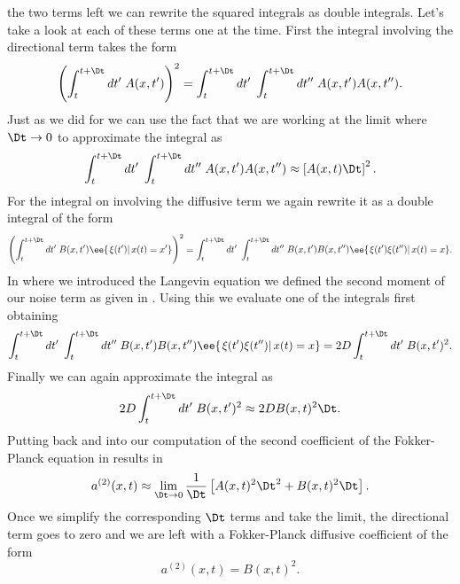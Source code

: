 the two terms left we can rewrite the squared integrals as double integrals.
Let's take a look at each of these terms one at the time. First the integral 
involving the directional term takes the form
\begin{equation}
    \left(  
        \int_t^{t + \Dt} dt'\; A(x, t')
    \right)^2 =
    \int_t^{t + \Dt} dt'\; \int_t^{t + \Dt} dt''\;
    A(x, t') A(x, t'').
\end{equation}
Just as we did for  we can use the fact that we
are working at the limit where $\Dt \rightarrow 0$ to approximate the integral
as 
\begin{equation}
    \int_t^{t + \Dt} dt'\; \int_t^{t + \Dt} dt''\;
    A(x, t') A(x, t'') \approx \left[ A(x, t)  \Dt\right]^2.
    \label{eq_directional_int_approx}
\end{equation}
For the integral on  involving the diffusive term we again
rewrite it as a double integral of the form
\begin{equation}
    \left(
    \int_t^{t + \Dt} dt'\; B(x, t') \ee{\left.\xi(t')
    \right\vert x(t) = x'}
    \right)^2 =
    \int_t^{t + \Dt} dt'\; \int_t^{t + \Dt} dt''\;
    B(x, t') B(x, t'') \ee{\left. \xi(t') \xi(t'') \right\vert x(t) = x}.
\end{equation}
In  where we introduced the Langevin equation we
defined the second moment of our noise term as given in .
Using this we evaluate one of the integrals first obtaining
\begin{equation}
    \int_t^{t + \Dt} dt'\; \int_t^{t + \Dt} dt''\;
    B(x, t') B(x, t'') \ee{\left. \xi(t') \xi(t'') \right\vert x(t) = x} =
    2D \int_t^{t + \Dt} dt'\; B(x, t')^2.
\end{equation}
Finally we can again approximate the integral as
\begin{equation}
    2D \int_t^{t + \Dt} dt'\; B(x, t')^2 \approx 2D B(x, t)^2 \Dt.
    \label{eq_diffusive_int_approx}
\end{equation}
Putting back  and
 into our computation of the second coefficient
of the Fokker-Planck equation in  results in
\begin{equation}
    a^{(2)}(x, t) \approx \lim_{\Dt \rightarrow 0} {1 \over \Dt}
    \left[ A(x, t)^2\Dt^2 + B(x, t)^2\Dt \right].
\end{equation}
Once we simplify the corresponding $\Dt$ terms and take the limit, the
directional term goes to zero and we are left with a Fokker-Planck diffusive
coefficient of the form
\begin{equation}
    a^{(2)}(x, t) = B(x, t)^2.
\end{equation}